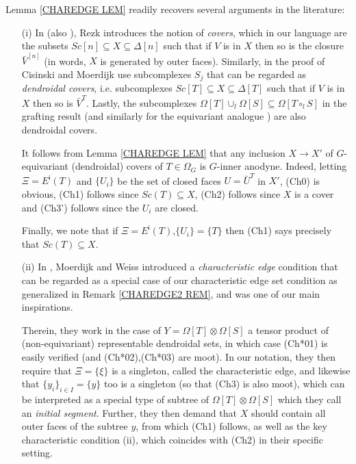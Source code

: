 \documentclass[a4paper,10pt,draft]{article}%
\numberwithin{equation}{section}%
\numberwithin{figure}{section}
\begin{document}
\begin{remark} Lemma \ref{CHAREDGE LEM} readily recovers several arguments in the literature:
\begin{itemize}
\item[(i)] In \cite[\S 10]{Rez01} (also \cite[\S 6.2]{Rez10}), Rezk introduces the notion of \textit{covers}, which in our language are the subsets
$Sc[n] \subseteq X \subseteq \Delta[n]$
such that if $V$ is in $X$ then so is the closure $\bar{V}^{[n]}$
(in words, $X$ is generated by outer faces).
Similarly, in the proof of \cite[Prop. 2.4]{CM13a}
Cisinski and Moerdijk use subcomplexes $S_j$ that can be regarded as
\textit{dendroidal covers},
i.e. subcomplexes
$Sc[T] \subseteq X \subseteq \Delta[T]$
such that if $V$ is in $X$ then so is $\bar{V}^{T}$.
Lastly, the subcomplexes 
$\Omega[T] \cup_l \Omega[S] \subseteq \Omega[T \circ_l S]$
in the grafting result \cite[Lemma 5.2]{MW09} (and similarly for the equivariant analogue \cite[Prop. 6.19]{Per17}) are also dendroidal covers.

It follows from Lemma \ref{CHAREDGE LEM}
that any inclusion $X \to X'$ of $G$-equivariant (dendroidal) covers of $T\in \Omega_G$
is $G$-inner anodyne. 
Indeed, letting $\Xi = E^{\mathsf{i}}(T)$ and $\{U_i\}$ be the set of closed faces $U = \bar{U}^T$ in $X'$, (Ch0) is obvious, (Ch1) follows since 
$Sc(T) \subseteq X$, (Ch2) follows since $X$ is a cover and
(Ch3') follows since the $U_i$ are closed.

Finally, we note that if $\Xi=E^{\mathsf{i}}(T)$,$\{U_i\}=\{T\}$
then (Ch1) says precisely that $Sc(T) \subseteq X$.

\item[(ii)] In \cite[Lemma 9.7]{MW09}, Moerdijk and Weiss introduced a \textit{characteristic edge} condition that can be regarded as a special case of our characteristic edge set condition as generalized in Remark \ref{CHAREDGE2 REM}, and was one of our main inspirations.

Therein, they work in the case of $Y= \Omega[T] \otimes \Omega[S]$
a tensor product of (non-equivariant) representable dendroidal sets, in which case (Ch*01) is easily verified 
(and (Ch*02),(Ch*03) are moot).
In our notation, they then require that
$\Xi = \{\xi\}$ is a singleton, called the characteristic edge,
and likewise that $\{y_i\}_{i\in I}=\{y\}$ too is a singleton (so that (Ch3) is also moot), which can be interpreted as a special type of subtree of 
$\Omega[T] \otimes \Omega[S]$ which they call an \textit{initial segment}.
Further, they then demand that $X$ should contain all outer faces of the subtree $y$, from which (Ch1) follows, 
as well as the key characteristic condition 
\cite[Lemma 9.7]{MW09}(ii),
which coincides with (Ch2) in their specific setting.


\end{itemize}
\end{remark}
\end{document}
